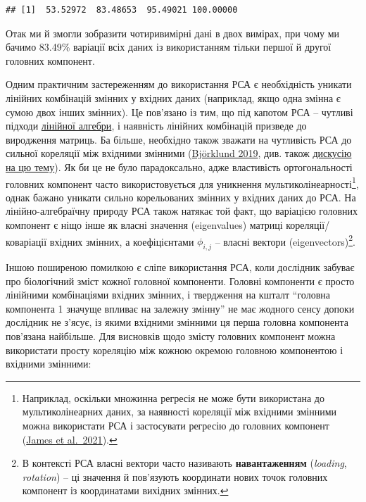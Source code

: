 \documentclass[
  11pt,
]{book}
\newenvironment{Shaded}{\begin{snugshade}}{\end{snugshade}}
\newcommand{\CommentTok}[1]{\textcolor[rgb]{0.56,0.35,0.01}{\textit{#1}}}
\newcommand{\DecValTok}[1]{\textcolor[rgb]{0.00,0.00,0.81}{#1}}
\newcommand{\FunctionTok}[1]{\textcolor[rgb]{0.13,0.29,0.53}{\textbf{#1}}}
\newcommand{\NormalTok}[1]{#1}
\newcommand{\SpecialCharTok}[1]{\textcolor[rgb]{0.81,0.36,0.00}{\textbf{#1}}}
\begin{document}
\begin{Shaded}
\end{Shaded}

\begin{verbatim}
## [1]  53.52972  83.48653  95.49021 100.00000
\end{verbatim}

Отак ми й змогли зобразити чотиривимірні дані в двох вимірах, при чому ми бачимо 83.49\% варіації всіх даних із використанням тільки першої й другої головних компонент.

Одним практичним застереженням до використання РСА є необхідність уникати лінійних комбінацій змінних у вхідних даних (наприклад, якщо одна змінна є сумою двох інших змінних). Це пов'язано із тим, що під капотом РСА -- чутливі підходи \hyperref[matrices]{лінійної алгебри}, і наявність лінійних комбінацій призведе до виродження матриць. Ба більше, необхідно також зважати на чутливість РСА до сильної кореляції між вхідними змінними (\href{https://doi.org/10.1111/evo.13835}{Björklund 2019}, див. також \href{https://stats.stackexchange.com/questions/50537/should-one-remove-highly-correlated-variables-before-doing-pca}{дискусію на цю тему}). Як би це не було парадоксально, адже властивість ортогональності головних компонент часто використовується для уникнення мультиколінеарності\footnote{Наприклад, оскільки множинна регресія не може бути використана до мультиколінеарних даних, за наявності кореляції між вхідними змінними можна використати РСА і застосувати регресію до головних компонент (\href{https://www.statlearning.com/}{James et al.~2021}).}, однак бажано уникати сильно корельованих змінних у вхідних даних до РСА. На лінійно-алгебраїчну природу РСА також натякає той факт, що варіацією головних компонент є ніщо інше як власні значення (eigenvalues) матриці кореляції/коваріації вхідних змінних, а коефіцієнтами \(\phi_{i,j}\) -- власні вектори (eigenvectors)\footnote{В контексті РСА власні вектори часто називають \textbf{навантаженням} (\emph{loading}, \emph{rotation}) -- ці значення й пов'язують координати нових точок головних компонент із координатами вихідних змінних.}.

Іншою поширеною помилкою є сліпе використання РСА, коли дослідник забуває про біологічний зміст кожної головної компоненти. Головні компоненти є просто лінійними комбінаціями вхідних змінних, і твердження на кшталт ``головна компонента 1 значуще впливає на залежну змінну'' не має жодного сенсу допоки дослідник не з'ясує, із якими вхідними змінними ця перша головна компонента пов'язана найбільше. Для висновків щодо змісту головних компонент можна використати просту кореляцію між кожною окремою головною компонентою і вхідними змінними:
\end{document}
